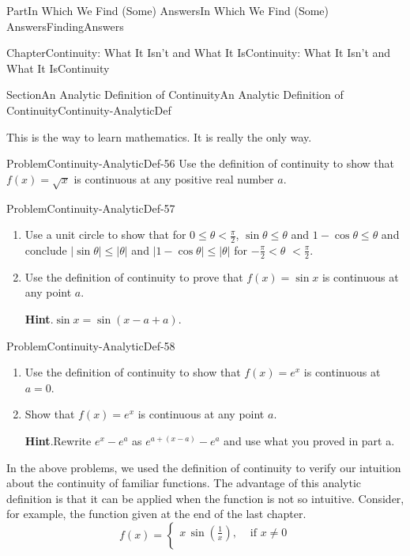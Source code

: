 \documentclass[oneside,10pt,]{book}
\newcommand{\blocktitlefont}{\relax}
\numberwithin{equation}{part}
\newcommand{\abs}[1]{\left|#1\right|}
\newcommand{\lt}{<}
\newcommand{\amp}{&}
\begin{document}
\begin{partptx}{Part}{In Which We Find (Some) Answers}{}{In Which We Find (Some) Answers}{}{}{FindingAnswers}
\begin{chapterptx}{Chapter}{Continuity: What It Isn't and What It Is}{}{Continuity: What It Isn't and What It Is}{}{}{Continuity}
\begin{sectionptx}{Section}{An Analytic Definition of Continuity}{}{An Analytic Definition of Continuity}{}{}{Continuity-AnalyticDef}
\begin{quote}
\end{quote}
This is the way to learn mathematics.  It is really the only way.%
\begin{problem}{Problem}{}{Continuity-AnalyticDef-56}%
Use the definition of continuity to show that \(f(x)=\sqrt{x}\) is continuous at any positive real number \(a\).%
\end{problem}
\begin{problem}{Problem}{}{Continuity-AnalyticDef-57}%
\begin{enumerate}[font=\bfseries,label=(\alph*),ref=\alph*]%
\item{}Use a unit circle to show that for \(0\leq\theta\lt
\frac{\pi}{2}\), \(\sin \theta\leq\theta\) and \(1-\cos \theta\leq\theta\) and conclude \(\abs{\sin
\theta}\leq\abs{\theta}\) and \(\abs{1-\cos
\theta}\leq\abs{\theta}\) for \(-\frac{\pi}{2}\lt
\theta\) \(\lt \frac{\pi}{2}\).%
\item{}Use the definition of continuity to prove that \(f(x)=\sin x\) is continuous at any point \(a\).%
\par\smallskip%
\noindent\textbf{\blocktitlefont Hint}.\hypertarget{Continuity-AnalyticDef-57-3-2}{}\quad{}\(\sin x=\sin\left(x-a+a\right)\).%
\end{enumerate}%
\end{problem}
\begin{problem}{Problem}{}{Continuity-AnalyticDef-58}%
\begin{enumerate}[font=\bfseries,label=(\alph*),ref=\alph*]%
\item{}Use the definition of continuity to show that \(f(x)=e^x\) is continuous at \(a=0\).%
\item{}Show that \(f(x)=e^x\) is continuous at any point \(a\).%
\par\smallskip%
\noindent\textbf{\blocktitlefont Hint}.\hypertarget{Continuity-AnalyticDef-58-4-2}{}\quad{}Rewrite \(e^x-e^a\) as \(e^{a+(x-a)}-e^a\) and use what you proved in part a.%
\end{enumerate}%
\end{problem}
In the above problems, we used the definition of continuity to verify our intuition about the continuity of familiar functions.  The advantage of this analytic definition is that it can be applied when the function is not so intuitive.  Consider, for example, the function given at the end of the last chapter.%
\begin{equation*}
f(x)= \begin{cases}
x\,\sin\left(\frac{1}{x}\right),\amp \text{ if } x\neq 0\\

\end{cases}
\end{equation*}
\end{sectionptx}
\end{chapterptx}
\end{partptx}
\end{document}
